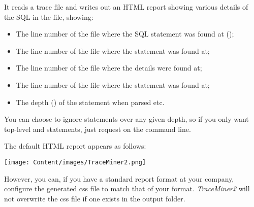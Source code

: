 \begin{appendix}
It reads a trace file and writes out an HTML report showing various
details of the SQL in the file, showing:

\begin{itemize}
\tightlist
\item
  The line number of the file where the SQL statement was found at
  ();
\item
  The line number of the file where  the  statement was found at;
\item
  The line number of the file where  the  details were found at;
\item
  The line number of the file where  the  statement was found at;
\item
  The depth () of the statement when parsed etc.
\end{itemize}

You can choose to ignore statements over any given depth, so if you only
want top-level and  statements, just request  on the
command line. 

The default HTML report appears as follows:

\texttt{[image: Content/images/TraceMiner2.png]}

However, you can, if you have a standard report format at your company,
configure the generated css file to match that of your format.
\emph{TraceMiner2} will not overwrite the css file if one exists in the
output folder.



\end{appendix}
